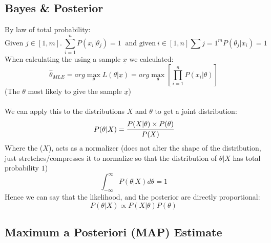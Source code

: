 \documentclass{report}
\begin{document}
        \subsection*{Bayes \& Posterior}
            By law of total probability:
            \[\text{Given } j \in [1,m]. \ \sum_{i=1}^nP(x_i|\theta_j) = 1 \ \text{ and given} \ i \in [1,n] \sum{j = 1}^mP(\theta_j|x_i) = 1\]
            When calculating the  using a sample $\underline{x}$ we calculated:
            \[\hat{\theta}_{MLE} = arg \max_{\theta} L(\theta|\underline{x}) = arg \max_{\theta} \left[ \prod_{i=1}^n P(x_i|\theta) \right]\]
            (The $\theta$ most likely to give the sample $\underline{x}$)
            \\
            \\ We can apply this to the distributions $X$ and $\theta$ to get a joint distribution:
            \[P(\theta|X) = \cfrac{P(X|\theta)\times P(\theta)}{P(X)}\]
            Where the  ($X$), acts as a normalizer (does not alter the shape of the distribution, just stretches/compresses it to normalize so that the distribution of $\theta|X$ has total probability $1$)
            \[\int_{-\infty}^{\infty}P(\theta|X)d\theta = 1\]
            Hence we can say that the likelihood, and the posterior are directly proportional:
            \[P(\theta|X) \varpropto P(X|\theta)P(\theta)\]
        \subsection*{Maximum a Posteriori (MAP) Estimate}
    
\end{document}
